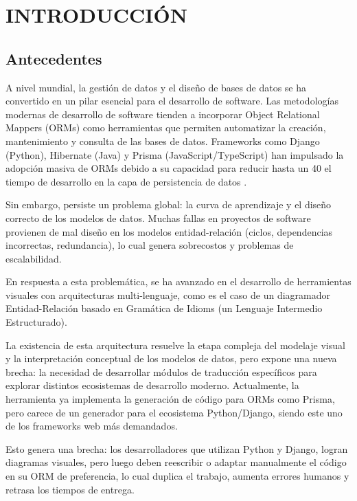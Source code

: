 \chapter{INTRODUCCIÓN}
\label{cap:introduccion}

\section{Antecedentes}
\label{sec:intro-antecedentes}
A nivel mundial, la gestión de datos y el diseño de bases de datos se ha convertido en un
pilar esencial para el desarrollo de software. Las metodologías modernas de desarrollo de
software tienden a incorporar Object Relational Mappers (ORMs) como herramientas que
permiten automatizar la creación, mantenimiento y consulta de las bases de datos.
Frameworks como Django (Python), Hibernate (Java) y Prisma (JavaScript/TypeScript) han
impulsado la adopción masiva de ORMs debido a su capacidad para reducir hasta un 40%
el tiempo de desarrollo en la capa de persistencia de datos \cite{jetbrains2022ecosystem}.

Sin embargo, persiste un problema global: la curva de aprendizaje y el diseño correcto de
los modelos de datos. Muchas fallas en proyectos de software provienen de mal diseño en
los modelos entidad-relación (ciclos, dependencias incorrectas, redundancia), lo cual genera
sobrecostos y problemas de escalabilidad.

En respuesta a esta problemática, se ha avanzado en el desarrollo de herramientas visuales
con arquitecturas multi-lenguaje, como es el caso de un diagramador Entidad-Relación
basado en Gramática de Idioms (un Lenguaje Intermedio Estructurado).

La existencia de esta arquitectura resuelve la etapa compleja del modelaje visual y la
interpretación conceptual de los modelos de datos, pero expone una nueva brecha: la
necesidad de desarrollar módulos de traducción específicos para explorar distintos
ecosistemas de desarrollo moderno. Actualmente, la herramienta ya implementa la
generación de código para ORMs como Prisma, pero carece de un generador para el
ecosistema Python/Django, siendo este uno de los frameworks web más demandados.

Esto genera una brecha: los desarrolladores que utilizan Python y Django, logran diagramas
visuales, pero luego deben reescribir o adaptar manualmente el código en su ORM de
preferencia, lo cual duplica el trabajo, aumenta errores humanos y retrasa los tiempos de
entrega.

